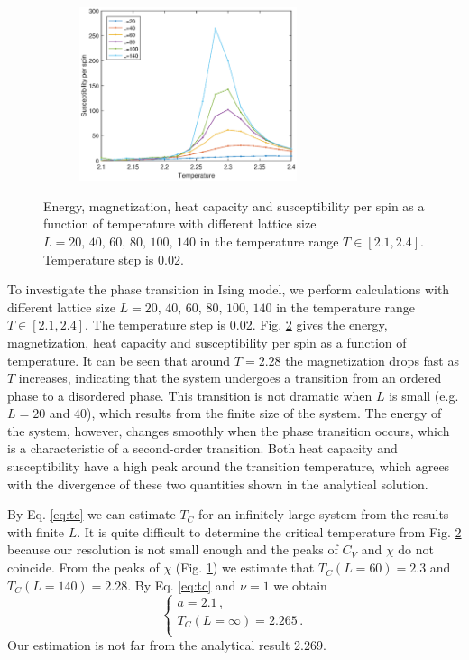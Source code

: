 \begin{figure}[tb]
\begin{subfigure}[tb]{0.5\textwidth}
		\caption{}
	\end{subfigure}
	~
	\begin{subfigure}[tb]{0.5\textwidth}
		\centering
		\includegraphics[width=0.7\textwidth]{Tran_sus.eps}		
		\caption{}
		\label{fig:transition_sus}
	\end{subfigure}
	\caption{Energy, magnetization, heat capacity and susceptibility per spin as a function of temperature
	with different lattice size $L=20,\,40,\,60,\,80,\,100,\,140$ in the temperature range $T\in[2.1,2.4]$. 
	Temperature step is 0.02. }
	\label{fig:transition}
\end{figure}
To investigate the phase transition in Ising model, we perform calculations with different lattice size 
$L=20,\,40,\,60,\,80,\,100,\,140$ in the temperature range $T\in[2.1,2.4]$. 
The temperature step is 0.02. 
Fig. \ref{fig:transition} gives the energy, magnetization, heat capacity and susceptibility per spin as a function of temperature. 
It can be seen that around $T=2.28$ the magnetization drops fast as $T$ increases, 
indicating that the system undergoes a transition from an ordered phase to a disordered phase. 
This transition is not dramatic when $L$ is small (e.g. $L=20$ and $40$), which results from the finite size of the system. 
The energy of the system, however, changes smoothly when the phase transition occurs, 
which is a characteristic of a second-order transition. 
Both heat capacity and susceptibility have a high peak around the transition temperature, 
which agrees with the divergence of these two quantities shown in the analytical solution. 
\par
By Eq. \ref{eq:tc} we can estimate $T_C$ for an infinitely large system from the results with finite $L$. 
It is quite difficult to determine the critical temperature from Fig. \ref{fig:transition} 
because our resolution is not small enough and the peaks of $C_V$ and $\chi$ do not coincide. 
From the peaks of $\chi$ (Fig. \ref{fig:transition_sus}) we estimate that $T_C(L=60)=2.3$ and $T_C(L=140)=2.28$. 
By Eq. \ref{eq:tc} and $\nu=1$ we obtain 
\begin{equation}
\left\{
\begin{array}{c}
a=2.1\,,  \\
T_C(L=\infty)=2.265\,.  \\
\end{array}
\right.
\end{equation}
Our estimation is not far from the analytical result 2.269. 